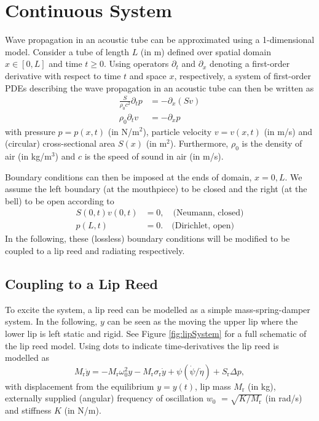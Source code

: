 \section{Continuous System}\label{sec:continuous}
Wave propagation in an acoustic tube can be approximated using a 1-dimensional model. Consider a tube of  length $L$ \SWcomment[$=L(t)$] (in m) defined over spatial domain $x\in [0, L]$ and time $t\geq 0$. Using operators $\partial_t$ and $\partial_x$ denoting a first-order derivative with respect to time $t$ and space $x$, respectively, a system of first-order PDEs describing the wave propagation in an acoustic tube can then be written as
\begin{subequations}\label{eq:firstOrderSystem}
    \begin{align}
        \frac{S}{\rho_0 c^2}\partial_t p &= -\partial_x(Sv)\label{eq:contPressure}\\
        \rho_0\partial_tv &= -\partial_xp\label{eq:contVelocity}
    \end{align}
\end{subequations}
with pressure $p = p(x,t)$ (in N/m$^2$), particle velocity $v = v(x,t)$ (in m/s) and (circular) cross-sectional area $S(x)$ (in m$^2$). Furthermore, $\rho_0$ is the density of air (in kg/m$^3$) and $c$ is the speed of sound in air (in m/s).

Boundary conditions can then be imposed at the ends of domain, $x=0, L$. We assume the left boundary (at the mouthpiece) to be closed and the right (at the bell) to be open according to  
\begin{subequations}\label{eq:contBound}
    \begin{align}
        S(0,t)v(0,t) &= 0, \quad \text{(Neumann, closed)}\label{eq:contNeumann}\\
        p(L,t) &= 0. \quad \text{(Dirichlet, open)}\label{eq:contDirichlet}
    \end{align}
\end{subequations}
In the following, these (lossless) boundary conditions will be modified to be coupled to a lip reed and radiating respectively.

\subsection{Coupling to a Lip Reed}
To excite the system, a lip reed can be modelled as a simple mass-spring-damper system. In the following, $y$ can be seen as the moving the upper lip where the lower lip is left static and rigid. See Figure \ref{fig:lipSystem} for a full schematic of the lip reed model. Using dots to indicate time-derivatives the lip reed is modelled as
\begin{equation}\label{eq:lipReedCont}
    M_\text{r}\ddot y = -M_\text{r}\omega_0^2 y - M_\text{r} \sigma_\text{r} \dot y +\psi(\dot \psi/
\dot \eta)+ S_\text{r}\Delta p,
\end{equation}
with displacement from the equilibrium $y = y(t)$, lip mass $M_\text{r}$ (in kg), externally supplied (angular) frequency of oscillation $w_0$ \SWcomment[$= w_0(t)$] $= \sqrt{K/M_\text{r}}$ (in rad/s) and stiffness $K$ \SWcomment[$= K(t)$] (in N/m).

